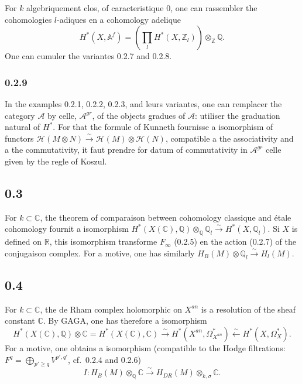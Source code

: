 \documentclass[12pt,a4paper]{article}
\theoremstyle{plain}
\theoremstyle{definition}
\theoremstyle{remark}
\newcommand{\Q}{\mathbb{Q}}
\newcommand{\R}{\mathbb{R}}
\newcommand{\C}{\mathbb{C}}
\newcommand{\Z}{\mathbb{Z}}
\newcommand{\A}{\mathbb{A}}
\begin{document}
For $k$ algebriquement clos, of caracteristique $0$, one can rassembler the cohomologies
$l$-adiques en a cohomology adelique
\[
H^*(X, \A^f) = (\prod_l H^*(X, \Z_l)) \otimes_{\Z} \Q.
\]
One can cumuler the variantes 0.2.7 and 0.2.8.

\subsubsection*{0.2.9}

In the examples 0.2.1, 0.2.2, 0.2.3, and leurs variantes, one can remplacer the category
$\mathcal{A}$ by celle, $\mathcal{A}^{gr}$, of the objects gradues of $\mathcal{A}$: utiliser the graduation natural of $H^*$.
For that the formule of Kunneth fournisse a isomorphism of functors
$\mathcal{H}(M \otimes N) \xrightarrow{\sim} \mathcal{H}(M) \otimes \mathcal{H}(N)$, compatible a the associativity and a the
commutativity, it faut prendre for datum of commutativity in $\mathcal{A}^{gr}$ celle given by
the regle of Koszul.

\subsection*{0.3}

For $k \subset \C$, the theorem of comparaison between cohomology classique and
étale cohomology fournit a isomorphism
$H^*(X(\C), \Q) \otimes_{\Q} \Q_l \xrightarrow{\sim} H^*(X, \Q_l)$.
Si $X$ is defined on $\R$, this isomorphism transforme $F_\infty$ (0.2.5) en the action (0.2.7) of
the conjugaison complex. For a motive, one has similarly $H_B(M) \otimes \Q_l \xrightarrow{\sim} H_l(M)$.

\subsection*{0.4}

For $k \subset \C$, the de Rham complex holomorphic on $X^{an}$ is a resolution of the
sheaf constant $\C$. By GAGA, one has therefore a isomorphism
\[
H^*(X(\C), \Q) \otimes \C = H^*(X(\C), \C) \xrightarrow{\sim} H^*(X^{an}, \Omega_{X^{an}}^*) \xleftarrow{\sim} H^*(X, \Omega_X^*).
\]
For a motive, one obtains a isomorphism (compatible to the Hodge filtrations:
$F^q = \bigoplus_{p' \geq q} V^{p',q'}$, cf.~0.2.4 and 0.2.6)
\begin{equation}\label{eq:0.4.1}
I: H_B(M) \otimes_{\Q} \C \xrightarrow{\sim} H_{DR}(M) \otimes_{k,\sigma} \C.
\end{equation}
\end{document}
